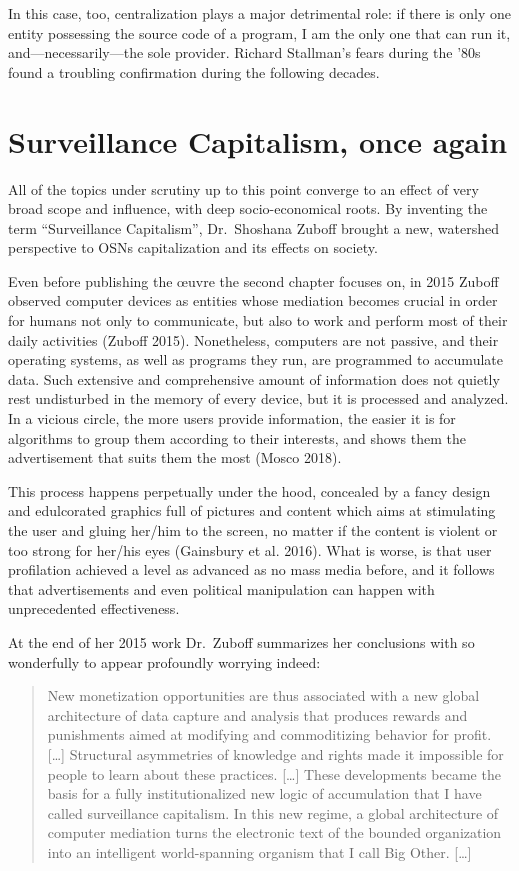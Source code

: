 \documentclass[
  a4paper,
]{book}
\begin{document}
In this case, too, centralization plays a major detrimental role: if there is only one entity possessing the source code of a program, I am the only one that can run it, and---necessarily---the sole provider. Richard Stallman's fears during the '80s found a troubling confirmation during the following decades.

\hypertarget{surveillance-capitalism-once-again}{%
\section{Surveillance Capitalism, once again}\label{surveillance-capitalism-once-again}}

All of the topics under scrutiny up to this point converge to an effect of very broad scope and influence, with deep socio-economical roots. By inventing the term ``Surveillance Capitalism'', Dr.~Shoshana Zuboff brought a new, watershed perspective to OSNs capitalization and its effects on society.

Even before publishing the œuvre the second chapter focuses on, in 2015 Zuboff observed computer devices as entities whose mediation becomes crucial in order for humans not only to communicate, but also to work and perform most of their daily activities {(Zuboff 2015)}. Nonetheless, computers are not passive, and their operating systems, as well as programs they run, are programmed to accumulate data. Such extensive and comprehensive amount of information does not quietly rest undisturbed in the memory of every device, but it is processed and analyzed. In a vicious circle, the more users provide information, the easier it is for algorithms to group them according to their interests, and shows them the advertisement that suits them the most {(Mosco 2018)}.

This process happens perpetually under the hood, concealed by a fancy design and edulcorated graphics full of pictures and content which aims at stimulating the user and gluing her/him to the screen, no matter if the content is violent or too strong for her/his eyes {(Gainsbury et al. 2016)}. What is worse, is that user profilation achieved a level as advanced as no mass media before, and it follows that advertisements and even political manipulation can happen with unprecedented effectiveness.

At the end of her 2015 work Dr.~Zuboff summarizes her conclusions with so wonderfully to appear profoundly worrying indeed:

\begin{quote}
New monetization opportunities are thus associated with a new global architecture of data capture and analysis that produces rewards and punishments aimed at modifying and commoditizing behavior for profit. {[}\ldots{]} Structural asymmetries of knowledge and rights made it impossible for people to learn about these practices. {[}\ldots{]} These developments became the basis for a fully institutionalized new logic of accumulation that I have called surveillance capitalism. In this new regime, a global architecture of computer mediation turns the electronic text of the bounded organization into an intelligent world-spanning organism that I call Big Other. {[}\ldots{]}
\end{quote}
\end{document}
